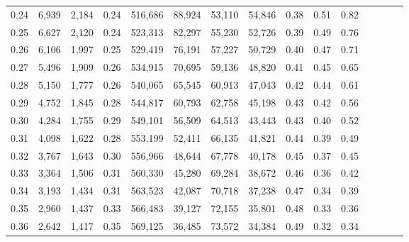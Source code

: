 \begin{tabular}{rrrcrrrrrrrrrrr}
0.24 &   6,939 &  2,184 &                                       0.24 &  516,686 &   88,924 &   53,110 &   54,846 &  0.38 &  0.51 &                         0.82 \\
0.25 &   6,627 &  2,120 &                                       0.24 &  523,313 &   82,297 &   55,230 &   52,726 &  0.39 &  0.49 &                         0.76 \\
0.26 &   6,106 &  1,997 &                                       0.25 &  529,419 &   76,191 &   57,227 &   50,729 &  0.40 &  0.47 &                         0.71 \\
0.27 &   5,496 &  1,909 &                                       0.26 &  534,915 &   70,695 &   59,136 &   48,820 &  0.41 &  0.45 &                         0.65 \\
0.28 &   5,150 &  1,777 &                                       0.26 &  540,065 &   65,545 &   60,913 &   47,043 &  0.42 &  0.44 &                         0.61 \\
0.29 &   4,752 &  1,845 &                                       0.28 &  544,817 &   60,793 &   62,758 &   45,198 &  0.43 &  0.42 &                         0.56 \\
0.30 &   4,284 &  1,755 &                                       0.29 &  549,101 &   56,509 &   64,513 &   43,443 &  0.43 &  0.40 &                         0.52 \\
0.31 &   4,098 &  1,622 &                                       0.28 &  553,199 &   52,411 &   66,135 &   41,821 &  0.44 &  0.39 &                         0.49 \\
0.32 &   3,767 &  1,643 &                                       0.30 &  556,966 &   48,644 &   67,778 &   40,178 &  0.45 &  0.37 &                         0.45 \\
0.33 &   3,364 &  1,506 &                                       0.31 &  560,330 &   45,280 &   69,284 &   38,672 &  0.46 &  0.36 &                         0.42 \\
0.34 &   3,193 &  1,434 &                                       0.31 &  563,523 &   42,087 &   70,718 &   37,238 &  0.47 &  0.34 &                         0.39 \\
0.35 &   2,960 &  1,437 &                                       0.33 &  566,483 &   39,127 &   72,155 &   35,801 &  0.48 &  0.33 &                         0.36 \\
0.36 &   2,642 &  1,417 &                                       0.35 &  569,125 &   36,485 &   73,572 &   34,384 &  0.49 &  0.32 &                         0.34 \\

\end{tabular}
